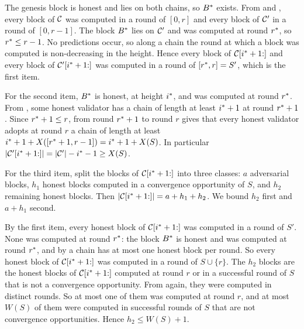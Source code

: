 \begin{proofof}{}
    The genesis block is honest and lies on both chains, so $B^{*}$ exists.
    From  and , every block of $\mathcal{C}$ was
    computed in a round of $[0,r]$ and every block of $\mathcal{C}'$ in a round of
    $[0,r-1]$. The block $B^{*}$ lies on $\mathcal{C}'$ and was computed at round
    $r^{*}$, so $r^{*}\le r-1$. No predictions occur, so along a chain the round
    at which a block was computed is non-decreasing in the height. Hence every
    block of $\mathcal{C}[i^{*}+1{:}]$ and every block of $\mathcal{C}'[i^{*}+1{:}]$ was computed
    in a round of $[r^{*},r]=S'$, which is the first item.

    For the second item, $B^{*}$ is honest, at height $i^{*}$, and was computed
    at round $r^{*}$. From , some honest validator has a chain of
    length at least $i^{*}+1$ at round $r^{*}+1$. Since $r^{*}+1\le r$,
     from round $r^{*}+1$ to round $r$ gives that every honest
    validator adopts at round $r$ a chain of length at least
    $i^{*}+1+X([r^{*}+1,r-1])=i^{*}+1+X(S)$. In particular
    $\lvert \mathcal{C}'[i^{*}+1{:}]\rvert=\lvert \mathcal{C}'\rvert-i^{*}-1\ge X(S)$.

    For the third item, split the blocks of $\mathcal{C}[i^{*}+1{:}]$ into three
    classes: $a$ adversarial blocks, $h_1$ honest blocks computed in a
    convergence opportunity of $S$, and $h_2$ remaining honest blocks. Then
    $\lvert \mathcal{C}[i^{*}+1{:}]\rvert=a+h_1+h_2$. We bound $h_2$ first and $a+h_1$ second.

    By the first item, every honest block of $\mathcal{C}[i^{*}+1{:}]$ was computed in a
    round of $S'$. None was computed at round $r^{*}$: the block $B^{*}$ is
    honest and was computed at round $r^{*}$, and by  a
    chain has at most one honest block per round. So every honest block of
    $\mathcal{C}[i^{*}+1{:}]$ was computed in a round of $S\cup\{r\}$. The $h_2$ blocks
    are the honest blocks of $\mathcal{C}[i^{*}+1{:}]$ computed at round $r$ or in a
    successful round of $S$ that is not a convergence opportunity. From
     again, they were computed in distinct rounds. So at
    most one of them was computed at round $r$, and at most $W(S)$ of them were
    computed in successful rounds of $S$ that are not convergence
    opportunities. Hence $h_2\le W(S)+1$.


\end{proofof}
